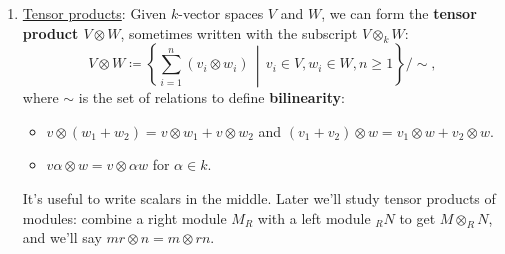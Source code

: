 \documentclass[12pt]{article}
\theoremstyle{definition}
\newtheorem{example}{Example}[section]
\begin{document}
\begin{enumerate}
    The \underline{fundamental questions} of direct sums is this: given a subrepresentation $W\subseteq V$, does it \underline{split}? That is, is there a \textbf{complementary} subrepresentation $U\subseteq V$ such that $V=W\oplus U$? 
    \begin{example}
        In the Permutation representation of $S_3$, $W$ splits because $V=W\oplus U$ (usually).
    \end{example}
    The matrix formulation of this question is this: given $W\subseteq V$ with matrices of the form 
    \begin{equation}
        \left[\begin{array}{c | c}
            * & *  \\
            \hline 
            0 & *  
        \end{array}\right],
    \end{equation}
    can we reorganize our bases to give us matrices of the form 
    \begin{equation}
        \left[\begin{array}{c | c}
            * & 0  \\
            \hline 
            0 & *  
        \end{array}\right]?
    \end{equation}
    The upper right block vanishing tells us that $U$ does not spill over into $W$. That maintains the fact that in the direct sum $W\oplus U$, $W$ and $U$ do not talk to each other at all (apart from the zero vector). 
    \item \underline{Tensor products}:
    Given $k$-vector spaces $V$ and $W$, we can form the \textbf{tensor product $V\otimes W$}, sometimes written with the subscript $V\otimes_kW$:
    \begin{equation}
        V\otimes W\coloneqq \left\{\sum\limits_{i=1}^n(v_i\otimes w_i)\,\middle|\,v_i\in V,w_i\in W, n\geq1\right\}\bigg/\sim,
    \end{equation}
    where $\sim$ is the set of relations to define \textbf{bilinearity}: 
    \begin{itemize}
        \item $v\otimes(w_1+w_2)=v\otimes w_1+v\otimes w_2$ and $(v_1+v_2)\otimes w=v_1\otimes w+v_2\otimes w$.
        \item $v\alpha\otimes w=v\otimes\alpha w$ for $\alpha\in k$.
    \end{itemize}
    It's useful to write scalars in the middle. Later we'll study tensor products of modules: combine a right module $M_R$ with a left module $_RN$ to get $M\otimes_RN$, and we'll say $mr\otimes n=m\otimes rn$.

\end{enumerate}
\end{document}
